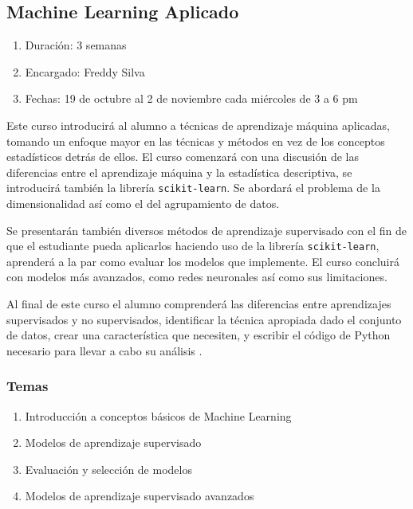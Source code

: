 \documentclass{article}
\begin{document}
        \subsection{Machine Learning Aplicado}

            \begin{enumerate}
                \item Duración: 3 semanas
                \item Encargado: Freddy Silva
                \item Fechas: 19 de octubre al 2 de noviembre cada miércoles de 3 a 6 pm
            \end{enumerate}

            Este curso introducirá al alumno a técnicas de aprendizaje máquina aplicadas, tomando un enfoque mayor en las técnicas y métodos en vez de los conceptos estadísticos detrás de ellos. El curso comenzará con una discusión de las diferencias entre el aprendizaje máquina y la estadística descriptiva, se introducirá también la librería \texttt{scikit-learn}. Se abordará el problema de la dimensionalidad así como el del agrupamiento de datos.

            Se presentarán también diversos métodos de aprendizaje supervisado con el fin de que el estudiante pueda aplicarlos haciendo uso de la librería \texttt{scikit-learn}, aprenderá a la par como evaluar los modelos que implemente. El curso concluirá con modelos más avanzados, como redes neuronales así como sus limitaciones.

            Al final de este curso el alumno comprenderá las diferencias entre aprendizajes supervisados y no supervisados, identificar la técnica apropiada dado el conjunto de datos, crear una característica que necesiten, y escribir el código de Python necesario para llevar a cabo su análisis \cite{applied-ml}.

            \subsubsection{Temas}

                \begin{enumerate}
                    \item Introducción a conceptos básicos de Machine Learning
                    \item Modelos de aprendizaje supervisado
                    \item Evaluación y selección de modelos
                    \item Modelos de aprendizaje supervisado avanzados
                \end{enumerate}
\end{document}
